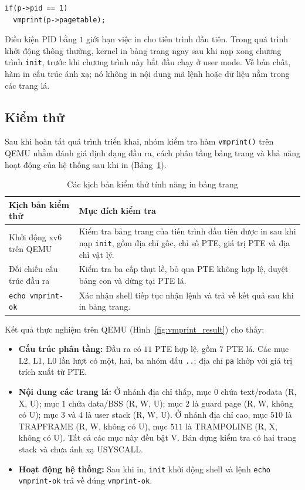 \documentclass[a4paper]{article}
\begin{document}
\begin{lstlisting}[numbers=none]
if(p->pid == 1)
  vmprint(p->pagetable);
\end{lstlisting}

Điều kiện PID bằng $1$ giới hạn việc in cho tiến trình đầu tiên.
Trong quá trình khởi động thông thường, kernel in bảng trang ngay
sau khi nạp xong chương trình \texttt{init}, trước khi chương trình
này bắt đầu chạy ở user mode. Về bản chất, hàm in cấu trúc ánh xạ;
nó không in nội dung mã lệnh hoặc dữ liệu nằm trong các trang lá.

\subsection{Kiểm thử}

Sau khi hoàn tất quá trình triển khai, nhóm kiểm tra hàm
\texttt{vmprint()} trên QEMU nhằm đánh giá định dạng đầu ra, cách
phân tầng bảng trang và khả năng hoạt động của hệ thống sau khi in
(Bảng~\ref{tab:vmprint_checks}).

\begin{table}[H]
\centering\small
\begin{tabularx}{\textwidth}{p{} X}
\toprule
\textbf{Kịch bản kiểm thử} & \textbf{Mục đích kiểm tra}\\
\midrule
Khởi động xv6 trên QEMU
 & Kiểm tra bảng trang của tiến trình đầu tiên được in sau khi nạp \texttt{init}, gồm địa chỉ gốc, chỉ số PTE, giá trị PTE và địa chỉ vật lý.\\
Đối chiếu cấu trúc đầu ra
 & Kiểm tra ba cấp thụt lề, bỏ qua PTE không hợp lệ, duyệt bảng con và dừng tại PTE lá.\\
\texttt{echo vmprint-ok}
 & Xác nhận shell tiếp tục nhận lệnh và trả về kết quả sau khi in bảng trang.\\
\bottomrule
\end{tabularx}
\caption{Các kịch bản kiểm thử tính năng in bảng trang}
\label{tab:vmprint_checks}
\end{table}

Kết quả thực nghiệm trên QEMU (Hình~\ref{fig:vmprint_result}) cho thấy:
\begin{itemize}[noitemsep,topsep=2pt]
\item \textbf{Cấu trúc phân tầng:} Đầu ra có $11$ PTE hợp lệ, gồm
$7$ PTE lá. Các mục L2, L1, L0 lần lượt có một, hai, ba nhóm dấu
\texttt{..}; địa chỉ \texttt{pa} khớp với giá trị trích xuất từ PTE.
\item \textbf{Nội dung các trang lá:} Ở nhánh địa chỉ thấp, mục $0$
chứa text/rodata (R, X, U); mục $1$ chứa data/BSS (R, W, U); mục $2$
là guard page (R, W, không có U); mục $3$ và $4$ là user stack
(R, W, U). Ở nhánh địa chỉ cao, mục $510$ là TRAPFRAME
(R, W, không có U), mục $511$ là TRAMPOLINE (R, X, không có U).
Tất cả các mục này đều bật V. Bản dựng kiểm tra có hai trang stack
và chưa ánh xạ USYSCALL.
\item \textbf{Hoạt động hệ thống:} Sau khi in, \texttt{init} khởi động
shell và lệnh \texttt{echo vmprint-ok} trả về đúng \texttt{vmprint-ok}.
\end{itemize}
\end{document}
